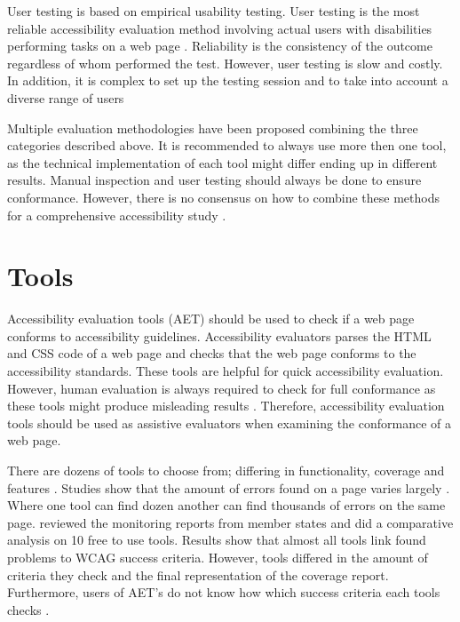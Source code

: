 User testing is based on empirical usability testing. User testing is the most reliable accessibility evaluation method involving actual users with disabilities performing tasks on a web page \citep[Chapter~26.2]{webaccessibility}. Reliability is the consistency of the outcome regardless of whom performed the test. However, user testing is slow and costly. In addition, it is complex to set up the testing session and to take into account a diverse range of users \citep{comparative_accessibility_methods}

Multiple evaluation methodologies have been proposed combining the three categories described above. It is recommended to always use more then one tool, as the technical implementation of each tool might differ ending up in different results. Manual inspection and user testing should always be done to ensure conformance. However, there is no consensus on how to combine these methods for a comprehensive accessibility study \citep[Chapter~26.2.1]{webaccessibility}.

\section{Tools}

Accessibility evaluation tools (AET) should be used to check if a web page conforms to accessibility guidelines. Accessibility evaluators parses the HTML and CSS code of a web page and checks that the web page conforms to the accessibility standards. These tools are helpful for quick accessibility evaluation. However, human evaluation is always required to check for full conformance as these tools might produce misleading results \citep{wcagevaluationtools}. Therefore, accessibility evaluation tools should be used as assistive evaluators when examining the conformance of a web page.

There are dozens of tools to choose from; differing in functionality, coverage and features \citep{tool_list}. Studies show that the amount of errors found on a page varies largely \citep{comparison_10.1145/3371300.3383346, comparison_10.1145/3607720.3607722, tool_analysis_directive}. Where one tool can find dozen another can find thousands of errors on the same page. \cite{tool_analysis_directive} reviewed the monitoring reports from member states and did a comparative analysis on 10 free to use tools. Results show that almost all tools link found problems to WCAG success criteria. However, tools differed in the amount of criteria they check and the final representation of the coverage report. Furthermore, users of AET's do not know how which success criteria each tools checks \citep{tool_analysis_directive}.

